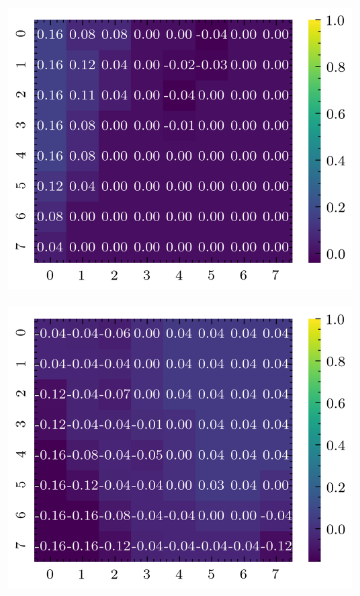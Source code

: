 \begin{figure}[H]
\begin{subfigure}[b]{0.19\textwidth}
        \includegraphics[width=\linewidth]{../img/5/quarry/best/heatmap-2d-2.png}
    \end{subfigure}
    \begin{subfigure}[b]{0.19\textwidth}
        \includegraphics[width=\linewidth]{../img/5/quarry/best/heatmap-2d-3.png}
    \end{subfigure}  
    \begin{subfigure}[b]{0.19\textwidth}

\end{subfigure}
\end{figure}

